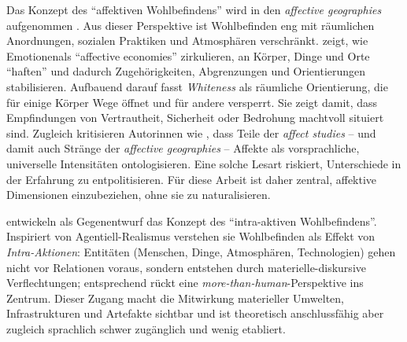 Das Konzept des \enquote{affektiven Wohlbefindens} wird in den \emph{affective geographies} aufgenommen \parencite{hoSocialGeographyIII2024}. Aus dieser Perspektive ist Wohlbefinden eng mit räumlichen Anordnungen, sozialen Praktiken und Atmosphären verschränkt. \textcite{ahmedAffectiveEconomies2004} zeigt, wie Emotionen\footnotemark als \enquote{affective economies} zirkulieren, an Körper, Dinge und Orte \enquote{haften} und dadurch Zugehörigkeiten, Abgrenzungen und Orientierungen stabilisieren. Aufbauend darauf fasst \textcite{ahmedPhenomenologyWhiteness2007} \emph{Whiteness} als räumliche Orientierung, die für einige Körper Wege öffnet und für andere versperrt. Sie zeigt damit, dass Empfindungen von Vertrautheit, Sicherheit oder Bedrohung machtvoll situiert sind. Zugleich kritisieren Autor\genderstern innen wie \textcite{hemmingsInvokingAffectCultural2005}, dass Teile der \emph{affect studies} -- und damit auch Stränge der \emph{affective geographies} -- Affekte als vorsprachliche, universelle Intensitäten ontologisieren. Eine solche Lesart riskiert, Unterschiede in der Erfahrung zu entpolitisieren. Für diese Arbeit ist daher zentral, affektive Dimensionen einzubeziehen, ohne sie zu naturalisieren.


\textcite{smithWhichBeingWellbeing2018} entwickeln als Gegenentwurf das Konzept des \enquote{intra-aktiven Wohlbefindens}. Inspiriert von \textcite{baradMeetingUniverseHalfway2007} Agentiell-Realismus verstehen sie Wohlbefinden als Effekt von \emph{Intra-Aktionen}: Entitäten (Menschen, Dinge, Atmosphären, Technologien) gehen nicht vor Relationen voraus, sondern entstehen durch materielle-diskursive Verflechtungen; entsprechend rückt eine \emph{more-than-human}-Perspektive ins Zentrum. Dieser Zugang macht die Mitwirkung materieller Umwelten, Infrastrukturen und Artefakte sichtbar und ist theoretisch anschlussfähig aber zugleich sprachlich schwer zugänglich und wenig etabliert.

